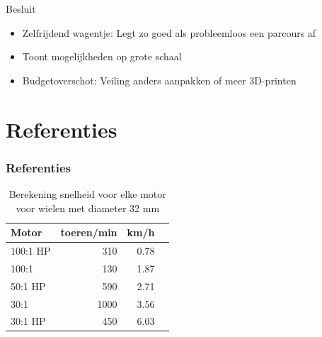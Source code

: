 \documentclass[aspectratio=169,kulak,t,handout]{kulakbeamer} %
\begin{document}
\begin{frame}{\Large Besluit}
\begin{itemize}
	\large \item Zelfrijdend wagentje: Legt zo goed als probleemloos een parcours af
	\item Toont mogelijkheden op grote schaal
	\item Budgetoverschot: Veiling anders aanpakken of meer 3D-printen
	
\end{itemize}	
	
\end{frame}


	
\section*{Referenties}

\begin{frame}[allowframebreaks]
	\frametitle{\Large Referenties}
	\nocite{*}
	
	
\end{frame}


\begin{frame}
	\begin{table}
		\centering
		
		\begin{tabular}{|l|r|r|r|}\hline
			\textbf{Motor}&	\textbf{toeren/min} &	\textbf{km/h}	\\\hline
			100:1 HP&	310&	0.78\\\hline
			100:1&	130&	1.87 	\\\hline
			50:1 HP&	590&	2.71 \\\hline
			30:1&	1000&	3.56	\\\hline
			30:1 HP&	450&	6.03 	\\\hline
		\end{tabular}
		\caption{Berekening snelheid voor elke motor voor wielen met diameter 32 mm}\label{MotorenTab}
		
	\end{table}
\end{frame}
\end{document}
